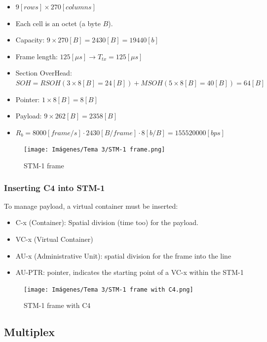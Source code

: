 \documentclass[
	12pt,
	twoside
]{book}
\begin{document}
\begin{itemize}
	\item $9 [rows] \times 270 [columns]$
	\item Each cell is an octet (a byte $B$).
	\item Capacity: $9 \times 270 [B] = 2430 [B] = 19440 [b]$
	\item Frame length: $125 [\mu s] \rightarrow T_{tx} = 125 [\mu s]$
	\item Section OverHead: $SOH = RSOH (3 \times 8 [B] = 24 [B]) + MSOH (5 \times 8 [B] = 40 [B]) = 64 [B]$
	\item Pointer: $1 \times 8 [B] = 8 [B]$
	\item Payload: $9 \times 262 [B] = 2358 [B]$
	\item $R_b = 8000 [frame/s] \cdot 2430 [B/frame] \cdot 8 [b/B] = 155520000 [bps]$
\end{itemize}

\begin{figure}[H]
	\centering
	\texttt{[image: Imágenes/Tema 3/STM-1 frame.png]}
	\caption{
		\label{fig:unit3_STM1_frame}
		STM-1 frame
	}
\end{figure}

\subsubsection{Inserting C4 into STM-1}

To manage payload, a virtual container must be inserted:

\begin{itemize}
	\item C-x (Container): Spatial division (time too) for the payload.
	\item VC-x (Virtual Container)
	\item AU-x (Administrative Unit): spatial division for the frame into the line
	\item AU-PTR: pointer, indicates the starting point of a VC-x within the STM-1
\end{itemize}

\begin{figure}[H]
	\centering
	\texttt{[image: Imágenes/Tema 3/STM-1 frame with C4.png]}
	\caption{
		\label{fig:unit3_STM1_C4}
		STM-1 frame with C4
	}
\end{figure}

\subsection{Multiplex}
\end{document}
